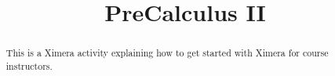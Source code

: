 \documentclass{xourse}
\title{PreCalculus II}
\begin{document}
  
\begin{abstract} %
This is a Ximera activity explaining how to get  
started with Ximera for course instructors.  
\end{abstract}  
\maketitle  
 
\end{document}
